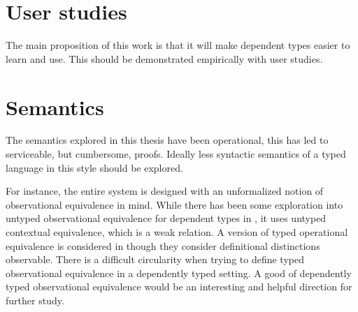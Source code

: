 \section{User studies}
 
The main proposition of this work is that it will make dependent types easier to learn and use.
This should be demonstrated empirically with user studies.
 
\section{Semantics}
 
The semantics explored in this thesis have been operational, this has led to serviceable, but cumbersome, proofs.
Ideally less syntactic semantics of a typed language in this style should be explored.
 
For instance, the entire system is designed with an unformalized notion of observational equivalence in mind.
While there has been some exploration into untyped observational equivalence for dependent types in \cite{sjoberg2015dependently,jia2010dependent}, it uses untyped contextual equivalence, which is a weak relation.
A version of typed operational equivalence is considered in \cite{VAKAR2018401} though they consider definitional distinctions observable. %
There is a difficult circularity when trying to define typed observational equivalence in a dependently typed setting.
A good of dependently typed observational equivalence would be an interesting and helpful direction for further study.


